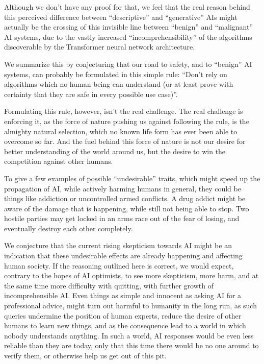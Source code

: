 \documentclass[12pt]{article}
\begin{document}
Although we don't have any proof for that, we feel that the real reason behind this
perceived difference between ``descriptive'' and ``generative'' AIs might actually be the
crossing of this invisible line between ``benign'' and ``malignant'' AI systems, due to
the vastly increased ``incomprehensibility'' of the algorithms discoverable by the
Transformer neural network architecture.

We summarize this by conjecturing that our road to safety, and to ``benign'' AI systems,
can probably be formulated in this simple rule: ``Don't rely on algorithms which no human
being can understand (or at least prove with certainty that they are safe in every
possible use case)''.

Formulating this rule, however, isn't the real challenge. The real challenge is enforcing
it, as the force of nature pushing us against following the rule, is the almighty natural
selection, which no known life form has ever been able to overcome so far. And the fuel
behind this force of nature is not our desire for better understanding of the world
around us, but the desire to win the competition against other humans.

To give a few examples of possible ``undesirable'' traits, which might speed up the
propagation of AI, while actively harming humans in general, they could be things like
addiction or uncontrolled armed conflicts. A drug addict might be aware of the damage
that is happening, while still not being able to stop. Two hostile parties may get locked
in an arms race out of the fear of losing, and eventually destroy each other completely.

We conjecture that the current rising skepticism towards AI might be an indication that
these undesirable effects are already happening and affecting human society. If the
reasoning outlined here is correct, we would expect, contrary to the hopes of AI
optimists, to see more skepticism, more harm, and at the same time more difficulty with
quitting, with further growth of incomprehensible AI. Even things as simple and innocent
as asking AI for a professional advice, might turn out harmful to humanity in the long
run, as such queries undermine the position of human experts, reduce the desire of other
humans to learn new things, and as the consequence lead to a world in which nobody
understands anything. In such a world, AI responses would be even less reliable than they
are today, only that this time there would be no one around to verify them, or otherwise
help us get out of this pit.
\end{document}
